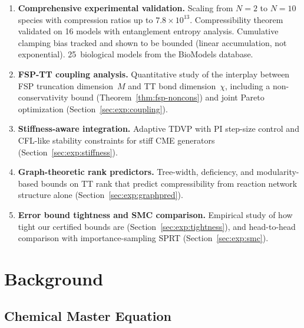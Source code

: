 \documentclass[11pt]{article}
\begin{document}
\begin{enumerate}[leftmargin=*,itemsep=2pt]
\item \textbf{Comprehensive experimental validation.}
  Scaling from $N=2$ to $N=10$ species with compression ratios
  up to $7.8\times 10^{13}$.
  Compressibility theorem validated on 16 models with entanglement
  entropy analysis.
  Cumulative clamping bias tracked and shown to be bounded
  (linear accumulation, not exponential).
  25~biological models from the BioModels database.

\item \textbf{FSP-TT coupling analysis.}
  Quantitative study of the interplay between FSP truncation dimension~$M$
  and TT bond dimension~$\chi$, including a non-conservativity bound
  (Theorem~\ref{thm:fsp-noncons}) and joint Pareto optimization
  (Section~\ref{sec:exp:coupling}).

\item \textbf{Stiffness-aware integration.}
  Adaptive TDVP with PI step-size control and CFL-like stability
  constraints for stiff CME generators
  (Section~\ref{sec:exp:stiffness}).

\item \textbf{Graph-theoretic rank predictors.}
  Tree-width, deficiency, and modularity-based bounds on TT rank
  that predict compressibility from reaction network structure alone
  (Section~\ref{sec:exp:graphpred}).

\item \textbf{Error bound tightness and SMC comparison.}
  Empirical study of how tight our certified bounds are
  (Section~\ref{sec:exp:tightness}), and head-to-head comparison
  with importance-sampling SPRT (Section~\ref{sec:exp:smc}).
\end{enumerate}

\section{Background}\label{sec:background}

\subsection{Chemical Master Equation}\label{sec:bg:cme}
\end{document}
